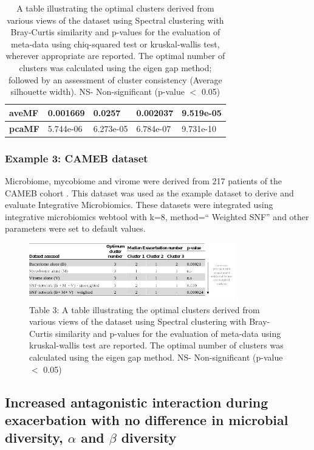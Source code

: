 \begin{table}[H]
\begin{tabular}{|l|l|l|l|l|}
		\textbf{aveMF}           & 0.001669          & 0.0257         & 0.002037              & 9.519e-05                         \\ \hline
		\textbf{pcaMF}           & 5.744e-06         & 6.273e-05      & 6.784e-07             & 9.731e-10                         \\ \hline
	\end{tabular}
	\caption{A table illustrating the optimal clusters derived from various views of the dataset using Spectral clustering with Bray-Curtis similarity and p-values for the evaluation of meta-data using chiq-squared test or kruskal-wallis test, wherever appropriate are reported. The optimal number of clusters was calculated using the eigen gap method; followed by an assessment of cluster consistency (Average silhouette width). NS- Non-significant (p-value $<$ 0.05)}
	\label{tab2}
\end{table}

\subsubsection{Example 3: CAMEB dataset}
Microbiome, mycobiome and virome were derived from 217 patients of the CAMEB cohort \cite{Mac1800766}. This dataset was used as the example dataset to derive and evaluate Integrative Microbiomics. These datasets were integrated using integrative microbiomics webtool with k=8, method=`` Weighted SNF” and other parameters were set to default values.

\begin{figure}[H]
	\centering
	\includegraphics[width=0.8\textwidth]{image/table.png}
	\caption*{Table 3: A table illustrating the optimal clusters derived from various views of the dataset using Spectral clustering with Bray-Curtis similarity and p-values for the evaluation of meta-data using kruskal-wallis test are reported. The optimal number of clusters was calculated using the eigen gap method. NS- Non-significant (p-value $<$ 0.05)}
\end{figure}

\subsection{Increased antagonistic interaction during exacerbation with no difference in microbial diversity, $\alpha$ and $\beta$ diversity}

